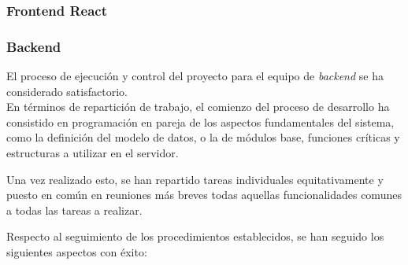 \documentclass[11pt, a4paper, titlepage]{article}
\begin{document}
\subsubsection{Frontend React}

\subsubsection{Backend}

El proceso de ejecución y control del proyecto para el equipo de \textit{backend} se ha considerado satisfactorio.\\


En términos de repartición de trabajo, el comienzo del proceso de desarrollo ha consistido en programación en pareja de los aspectos fundamentales del sistema, como la definición del modelo de datos, o la de módulos base, funciones críticas y estructuras a utilizar en el servidor. 

Una vez realizado esto, se han repartido tareas individuales equitativamente y puesto en común en reuniones más breves todas aquellas funcionalidades comunes a todas las tareas a realizar.


Respecto al seguimiento de los procedimientos establecidos, se han seguido los siguientes aspectos con éxito:
\end{document}
